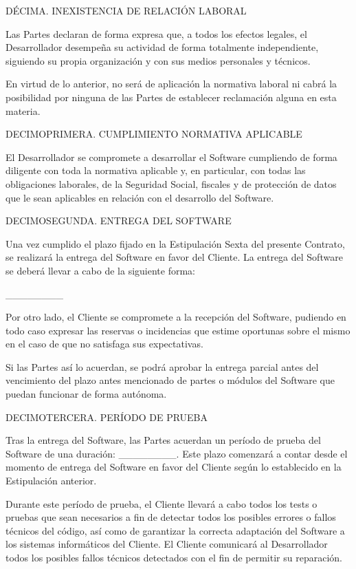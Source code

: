 \documentclass[a4paper,11pt]{report}
\begin{document}
	DÉCIMA. INEXISTENCIA DE RELACIÓN LABORAL
	
	Las Partes declaran de forma expresa que, a todos los efectos legales,
	el Desarrollador desempeña su actividad de forma totalmente
	independiente, siguiendo su propia organización y con sus medios
	personales y técnicos.
		
	En virtud de lo anterior, no será de aplicación la normativa laboral ni
	cabrá la posibilidad por ninguna de las Partes de establecer reclamación
	alguna en esta materia.
	
	DECIMOPRIMERA. CUMPLIMIENTO NORMATIVA APLICABLE
	
	El Desarrollador se compromete a desarrollar el Software cumpliendo de
	forma diligente con toda la normativa aplicable y, en particular, con
	todas las obligaciones laborales, de la Seguridad Social, fiscales y de
	protección de datos que le sean aplicables en relación con el desarrollo
	del Software.
	
	DECIMOSEGUNDA. ENTREGA DEL SOFTWARE
	
	Una vez cumplido el plazo fijado en la Estipulación Sexta del presente
	Contrato, se realizará la entrega del Software en favor del Cliente. La
	entrega del Software se deberá llevar a cabo de la siguiente forma:
	
	\_\_\_\_\_\_\_\_
	
	Por otro lado, el Cliente se compromete a la recepción del Software,
	pudiendo en todo caso expresar las reservas o incidencias que estime
	oportunas sobre el mismo en el caso de que no satisfaga sus
	expectativas.
	
	Si las Partes así lo acuerdan, se podrá aprobar la entrega parcial antes
	del vencimiento del plazo antes mencionado de partes o módulos del
	Software que puedan funcionar de forma autónoma.
	
	DECIMOTERCERA. PERÍODO DE PRUEBA
	
	Tras la entrega del Software, las Partes acuerdan un período de prueba
	del Software de una duración: \_\_\_\_\_\_\_\_. Este plazo comenzará a contar
	desde el momento de entrega del Software en favor del Cliente según lo
	establecido en la Estipulación anterior.
	
	Durante este período de prueba, el Cliente llevará a cabo todos los
	tests o pruebas que sean necesarios a fin de detectar todos los posibles
	errores o fallos técnicos del código, así como de garantizar la correcta
	adaptación del Software a los sistemas informáticos del Cliente. El
	Cliente comunicará al Desarrollador todos los posibles fallos técnicos
	detectados con el fin de permitir su reparación.
	
\end{document}
